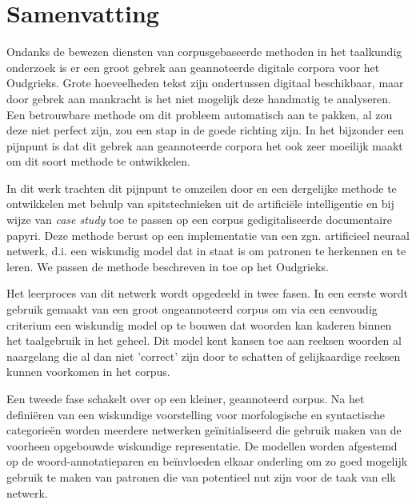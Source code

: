 
\begingroup
\let\clearpage\relax
\let\cleardoublepage\relax
\let\cleardoublepage\relax



\chapter*{Samenvatting}

Ondanks de bewezen diensten van corpusgebaseerde methoden in het
taalkundig onderzoek is er een groot gebrek aan geannoteerde digitale
corpora voor het Oudgrieks. Grote hoeveelheden tekst zijn ondertussen
digitaal beschikbaar, maar door gebrek aan mankracht is het niet
mogelijk deze handmatig te analyseren. Een betrouwbare methode om dit
probleem automatisch aan te pakken, al zou deze niet perfect zijn, zou
een stap in de goede richting zijn. In het bijzonder een pijnpunt is
dat dit gebrek aan geannoteerde corpora het ook zeer moeilijk maakt om
dit soort methode te ontwikkelen.

In dit werk trachten dit pijnpunt te omzeilen door en een dergelijke
methode te ontwikkelen met behulp van spitstechnieken uit de
artificiële intelligentie en bij wijze van \textit{case study} toe te
passen op een corpus gedigitaliseerde documentaire papyri. Deze
methode berust op een implementatie van een zgn. artificieel neuraal
netwerk, d.i. een wiskundig model dat in staat is om patronen te
herkennen en te leren. We passen de methode beschreven in
\cite{collobert-2011} toe op het Oudgrieks.

Het leerproces van dit netwerk wordt opgedeeld in twee fasen. In een
eerste wordt gebruik gemaakt van een groot ongeannoteerd corpus om via
een eenvoudig criterium een wiskundig model op te bouwen dat woorden
kan kaderen binnen het taalgebruik in het geheel.  Dit model kent
kansen toe aan reeksen woorden al naargelang die al dan niet 'correct'
zijn door te schatten of gelijkaardige reeksen kunnen voorkomen in het
corpus.

Een tweede fase schakelt over op een kleiner, geannoteerd corpus. Na
het defini\"eren van een wiskundige voorstelling voor morfologische en
syntactische categorie\"en worden meerdere netwerken ge\"initialiseerd
die gebruik maken van de voorheen opgebouwde wiskundige
representatie. De modellen worden afgestemd op de woord-annotatieparen
en be\"invloeden elkaar onderling om zo goed mogelijk gebruik te maken
van patronen die van potentieel nut zijn voor de taak van elk netwerk.

